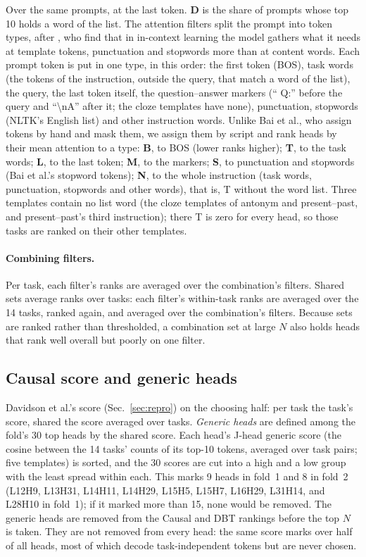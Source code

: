 \documentclass[10pt,a4paper]{article}
\begin{document}
Over the same prompts, at the last token. \textbf{D} is the share of prompts whose top 10 holds a word of the list. The attention filters split the prompt into token types, after \citet{bai2026performance}, who find that in in-context learning the model gathers what it needs at template tokens, punctuation and stopwords more than at content words. Each prompt token is put in one type, in this order: the first token (BOS), task words (the tokens of the instruction, outside the query, that match a word of the list), the query, the last token itself, the question--answer markers (`` Q:'' before the query and ``\textbackslash nA'' after it; the cloze templates have none), punctuation, stopwords (NLTK's English list) and other instruction words. Unlike Bai et al., who assign tokens by hand and mask them, we assign them by script and rank heads by their mean attention to a type: \textbf{B}, to BOS (lower ranks higher); \textbf{T}, to the task words; \textbf{L}, to the last token; \textbf{M}, to the markers; \textbf{S}, to punctuation and stopwords (Bai et al.'s stopword tokens); \textbf{N}, to the whole instruction (task words, punctuation, stopwords and other words), that is, T without the word list. Three templates contain no list word (the cloze templates of antonym and present--past, and present--past's third instruction); there T is zero for every head, so those tasks are ranked on their other templates.

\paragraph{Combining filters.} Per task, each filter's ranks are averaged over the combination's filters. Shared sets average ranks over tasks: each filter's within-task ranks are averaged over the 14 tasks, ranked again, and averaged over the combination's filters. Because sets are ranked rather than thresholded, a combination set at large $N$ also holds heads that rank well overall but poorly on one filter.

\subsection{Causal score and generic heads}\label{sec:causal}

Davidson et al.'s score (Sec.~\ref{sec:repro}) on the choosing half: per task the task's score, shared the score averaged over tasks. \emph{Generic heads} are defined among the fold's 30 top heads by the shared score. Each head's J-head generic score (the cosine between the 14 tasks' counts of its top-10 tokens, averaged over task pairs; five templates) is sorted, and the 30 scores are cut into a high and a low group with the least spread within each. This marks 9 heads in fold~1 and 8 in fold~2 (L12H9, L13H31, L14H11, L14H29, L15H5, L15H7, L16H29, L31H14, and L28H10 in fold~1); if it marked more than 15, none would be removed. The generic heads are removed from the Causal and DBT rankings before the top $N$ is taken. They are not removed from every head: the same score marks over half of all heads, most of which decode task-independent tokens but are never chosen.
\end{document}
